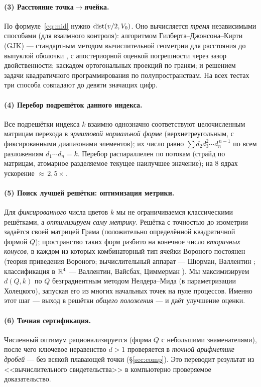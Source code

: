 \paragraph{(3) Расстояние точка${}\to{}$ячейка.} По
формуле~\eqref{eq:mid} нужно $\operatorname{dist}(v/2,V_0)$. Оно вычисляется \emph{тремя}
независимыми способами (для взаимного контроля): алгоритмом
Гилберта--Джонсона--Кирти (GJK) --- стандартным методом вычислительной
геометрии для расстояния до выпуклой оболочки \cite{GJK}, с апостериорной
оценкой погрешности через зазор двойственности; каскадом ортогональных проекций
по граням; и решением задачи квадратичного программирования по
полупространствам. На всех тестах три способа совпадают до девяти значащих цифр.

\paragraph{(4) Перебор подрешёток данного индекса.} Все подрешётки индекса $k$
взаимно однозначно соответствуют целочисленным матрицам перехода в
\emph{эрмитовой нормальной форме} (верхнетреугольным, с фиксированными
диапазонами элементов); их число равно $\sum d_2d_3^2\cdots d_n^{\,n-1}$ по
всем разложениям $d_1\cdots d_n=k$. Перебор распараллелен по потокам (страйд по матрицам, атомарное
разделяемое текущее наилучшее значение); на 8 ядрах ускорение
${\approx}\,2{,}5\times$.

\paragraph{(5) Поиск лучшей решётки: оптимизация метрики.} Для \emph{фиксированного}
числа цветов $k$ мы не ограничиваемся классическими решётками, а
\emph{оптимизируем саму метрику}. Решётка с точностью до изометрии задаётся
своей матрицей Грама (положительно определённой квадратичной формой $Q$);
пространство таких форм разбито на конечное число \emph{вторичных конусов}, в
каждом из которых комбинаторный тип ячейки Вороного постоянен (теория приведения
Вороного; вычислительный аппарат --- Шюрман, Валлентин \cite{SchurmannVallentin};
классификация в $\mathbb{R}^4$ --- Валлентин, Вайсбах, Циммерман \cite{VWZ}). Мы
максимизируем $d(Q,k)$ по $Q$ безградиентным методом Нелдера--Мида \cite{NelderMead}
(в параметризации Холецкого), запуская его из многих начальных точек на пуле
процессов. Именно этот шаг --- выход в решётки \emph{общего положения} --- и
даёт улучшение оценки.

\paragraph{(6) Точная сертификация.} Численный оптимум рационализируется (форма
$Q$ с небольшими знаменателями), после чего ключевое неравенство $d>1$
проверяется в \emph{точной арифметике дробей} --- без всякой плавающей точки
(\S\ref{sec:comp}). Это переводит результат из <<вычислительного свидетельства>>
в компьютерно проверяемое доказательство.

